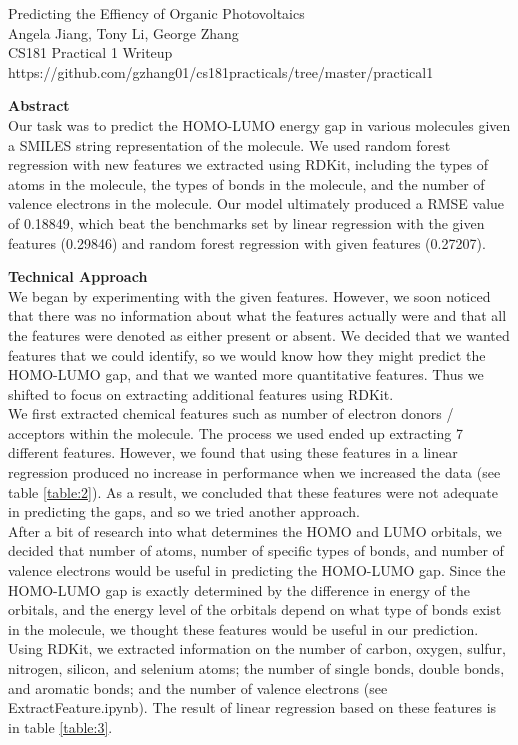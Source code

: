 \documentclass[12pt]{article}
\begin{document}
\begin{center}
Predicting the Effiency of Organic Photovoltaics \\
Angela Jiang, Tony Li, George Zhang \\ 
CS181 Practical 1 Writeup \\
https://github.com/gzhang01/cs181practicals/tree/master/practical1 \\
\end{center}

\bigskip
\bigskip

\textbf{Abstract} \\
Our task was to predict the HOMO-LUMO energy gap in various molecules given a SMILES string representation of the molecule. We used random forest regression with new features we extracted using RDKit, including the types of atoms in the molecule, the types of bonds in the molecule, and the number of valence electrons in the molecule. Our model ultimately produced a RMSE value of 0.18849, which beat the benchmarks set by linear regression with the given features (0.29846) and random forest regression with given features (0.27207).  \\

\bigskip

\textbf{Technical Approach} \\
We began by experimenting with the given features. However, we soon noticed that there was no information about what the features actually were and that all the features were denoted as either present or absent. We decided that we wanted features that we could identify, so we would know how they might predict the HOMO-LUMO gap, and that we wanted more quantitative features. Thus we shifted to focus on extracting additional features using RDKit. \\

We first extracted chemical features such as number of electron donors / acceptors within the molecule. The process we used ended up extracting 7 different features. However, we found that using these features in a linear regression produced no increase in performance when we increased the data (see table \ref{table:2}). As a result, we concluded that these features were not adequate in predicting the gaps, and so we tried another approach. \\

After a bit of research into what determines the HOMO and LUMO orbitals, we decided that number of atoms, number of specific types of bonds, and number of valence electrons would be useful in predicting the HOMO-LUMO gap. Since the HOMO-LUMO gap is exactly determined by the difference in energy of the orbitals, and the energy level of the orbitals depend on what type of bonds exist in the molecule, we thought these features would be useful in our prediction. Using RDKit, we extracted information on the number of carbon, oxygen, sulfur, nitrogen, silicon, and selenium atoms; the number of single bonds, double bonds, and aromatic bonds; and the number of valence electrons (see ExtractFeature.ipynb). The result of linear regression based on these features is in table \ref{table:3}. \\
\end{document}
